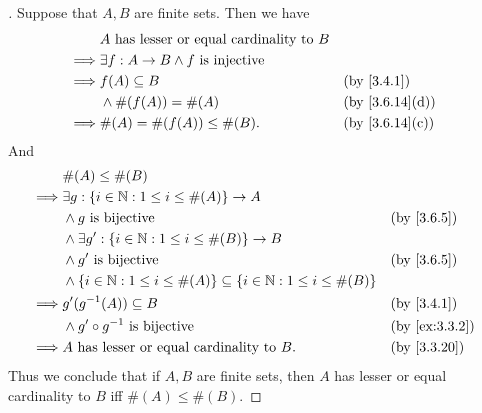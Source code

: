 \begin{proof}[]
	Suppose that \(A, B\) are finite sets.
	Then we have
	\begin{align*}
		         & A \text{ has lesser or equal cardinality to } B                                    \\
		\implies & \exists f : A \to B \land f \text{ is injective}                                   \\
		\implies & f(A) \subseteq B                                 &  & \by{3.4.1}                   \\
		         & \land \#(f(A)) = \#(A)                           &  & \text{(by \cref{3.6.14}(d))} \\
		\implies & \#(A) = \#(f(A)) \leq \#(B).                     &  & \text{(by \cref{3.6.14}(c))}
	\end{align*}
	And
	\begin{align*}
		         & \#(A) \leq \#(B)                                                                                             \\
		\implies & \exists g : \set{i \in \N : 1 \leq i \leq \#(A)} \to A                                                       \\
		         & \land g \text{ is bijective}                                                              &  & \by{3.6.5}    \\
		         & \land \exists g' : \set{i \in \N : 1 \leq i \leq \#(B)} \to B                                                \\
		         & \land g' \text{ is bijective}                                                             &  & \by{3.6.5}    \\
		         & \land \set{i \in \N : 1 \leq i \leq \#(A)} \subseteq \set{i \in \N : 1 \leq i \leq \#(B)}                    \\
		\implies & g'(g^{-1}(A)) \subseteq B                                                                 &  & \by{3.4.1}    \\
		         & \land g' \circ g^{-1} \text{ is bijective}                                                &  & \by{ex:3.3.2} \\
		\implies & A \text{ has lesser or equal cardinality to } B.                                          &  & \by{3.3.20}
	\end{align*}
	Thus we conclude that if \(A, B\) are finite sets, then \(A\) has lesser or equal cardinality to \(B\) iff \(\#(A) \leq \#(B)\).
\end{proof}

